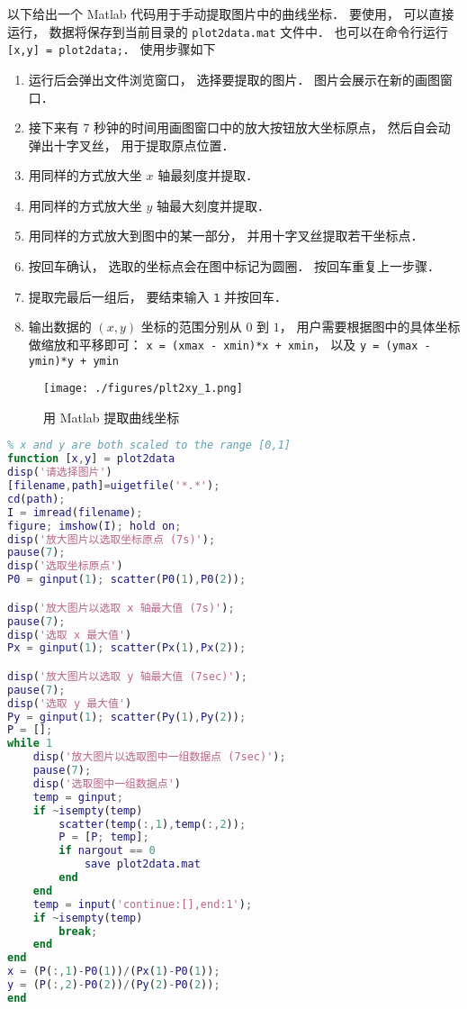 

以下给出一个 Matlab 代码用于手动提取图片中的曲线坐标． 要使用， 可以直接运行， 数据将保存到当前目录的 \verb|plot2data.mat| 文件中． 也可以在命令行运行 \verb|[x,y] = plot2data;|． 使用步骤如下

\begin{enumerate}
\item 运行后会弹出文件浏览窗口， 选择要提取的图片． 图片会展示在新的画图窗口．
\item 接下来有 7 秒钟的时间用画图窗口中的放大按钮放大坐标原点， 然后自会动弹出十字叉丝， 用于提取原点位置．
\item 用同样的方式放大坐 $x$ 轴最刻度并提取．
\item 用同样的方式放大坐 $y$ 轴最大刻度并提取．
\item 用同样的方式放大到图中的某一部分， 并用十字叉丝提取若干坐标点．
\item 按回车确认， 选取的坐标点会在图中标记为圆圈． 按回车重复上一步骤．
\item 提取完最后一组后， 要结束输入 \verb|1| 并按回车．
\item 输出数据的 $(x, y)$ 坐标的范围分别从 $0$ 到 $1$， 用户需要根据图中的具体坐标做缩放和平移即可： \verb|x = (xmax - xmin)*x + xmin|， 以及 \verb|y = (ymax - ymin)*y + ymin|
\end{enumerate}

\begin{figure}[ht]
\centering
\texttt{[image: ./figures/plt2xy\_1.png]}
\caption{用 Matlab 提取曲线坐标} \label{plt2xy_fig1}
\end{figure}

\begin{lstlisting}[language=matlab]
% Data Extractor for Plot
% x and y are both scaled to the range [0,1]
function [x,y] = plot2data
disp('请选择图片')
[filename,path]=uigetfile('*.*');
cd(path);
I = imread(filename);
figure; imshow(I); hold on;
disp('放大图片以选取坐标原点 (7s)');
pause(7);
disp('选取坐标原点')
P0 = ginput(1); scatter(P0(1),P0(2));

disp('放大图片以选取 x 轴最大值 (7s)');
pause(7);
disp('选取 x 最大值')
Px = ginput(1); scatter(Px(1),Px(2));

disp('放大图片以选取 y 轴最大值 (7sec)');
pause(7);
disp('选取 y 最大值')
Py = ginput(1); scatter(Py(1),Py(2));
P = [];
while 1
    disp('放大图片以选取图中一组数据点 (7sec)');
    pause(7);
    disp('选取图中一组数据点')
    temp = ginput;
    if ~isempty(temp)
        scatter(temp(:,1),temp(:,2));
        P = [P; temp];
        if nargout == 0
            save plot2data.mat
        end
    end
    temp = input('continue:[],end:1');
    if ~isempty(temp)
        break;
    end
end
x = (P(:,1)-P0(1))/(Px(1)-P0(1));
y = (P(:,2)-P0(2))/(Py(2)-P0(2));
end
\end{lstlisting}
